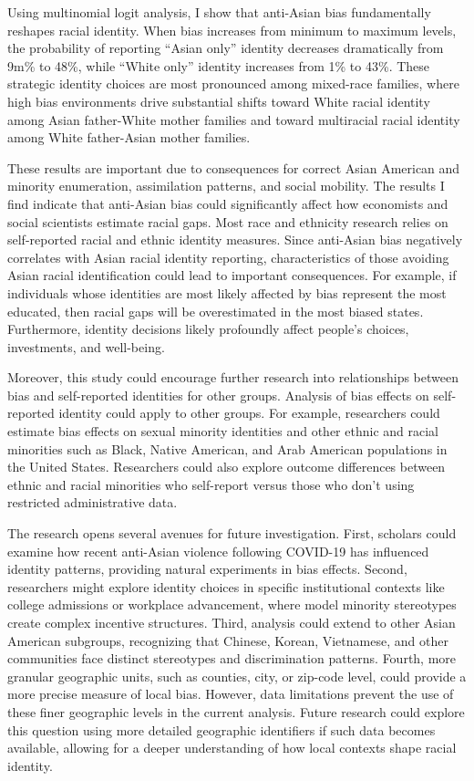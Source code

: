 Using multinomial logit analysis, I show that anti-Asian bias fundamentally reshapes racial identity. When bias increases from minimum to maximum levels, the probability of reporting ``Asian only'' identity decreases dramatically from 9m\% to 48\%, while ``White only'' identity increases from 1\% to 43\%. These strategic identity choices are most pronounced among mixed-race families, where high bias environments drive substantial shifts toward White racial identity among Asian father-White mother families and toward multiracial racial identity among White father-Asian mother families.

These results are important due to consequences for correct Asian American and minority enumeration, assimilation patterns, and social mobility. The results I find indicate that anti-Asian bias could significantly affect how economists and social scientists estimate racial gaps. Most race and ethnicity research relies on self-reported racial and ethnic identity measures. Since anti-Asian bias negatively correlates with Asian racial identity reporting, characteristics of those avoiding Asian racial identification could lead to important consequences. For example, if individuals whose identities are most likely affected by bias represent the most educated, then racial gaps will be overestimated in the most biased states. Furthermore, identity decisions likely profoundly affect people's choices, investments, and well-being.

Moreover, this study could encourage further research into relationships between bias and self-reported identities for other groups. Analysis of bias effects on self-reported identity could apply to other groups. For example, researchers could estimate bias effects on sexual minority identities and other ethnic and racial minorities such as Black, Native American, and Arab American populations in the United States. Researchers could also explore outcome differences between ethnic and racial minorities who self-report versus those who don't using restricted administrative data.

The research opens several avenues for future investigation. First, scholars could examine how recent anti-Asian violence following COVID-19 has influenced identity patterns, providing natural experiments in bias effects. Second, researchers might explore identity choices in specific institutional contexts like college admissions or workplace advancement, where model minority stereotypes create complex incentive structures. Third, analysis could extend to other Asian American subgroups, recognizing that Chinese, Korean, Vietnamese, and other communities face distinct stereotypes and discrimination patterns. Fourth, more granular geographic units, such as counties, city, or zip-code level, could provide a more precise measure of local bias. However, data limitations prevent the use of these finer geographic levels in the current analysis. Future research could explore this question using more detailed geographic identifiers if such data becomes available, allowing for a deeper understanding of how local contexts shape racial identity.

